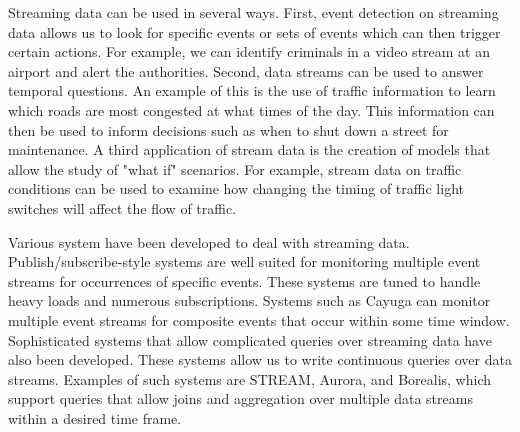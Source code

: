 \documentclass{article}
\begin{document}
Streaming data can be used in several ways.
First, event detection on streaming data allows us to look for specific events or sets of events which can then trigger certain actions. For example, we can identify criminals in a video stream at an airport and alert the authorities. Second, data streams can be used to answer temporal questions. An example of this is the use of traffic information to learn which roads are most congested at what times of the day. This information can then be used to inform decisions such as when to shut down a street for maintenance. 
A third application of stream data is the creation of models that allow the study of "what if" scenarios. For example, stream data on traffic conditions can be used to examine how changing the timing of traffic light switches will affect the flow of traffic. 

Various system have been developed to deal with streaming data. Publish/subscribe-style systems are well suited for monitoring multiple event streams for occurrences of specific events. These systems are tuned to handle heavy loads and numerous subscriptions. Systems such as Cayuga can monitor multiple event streams for composite events that occur within some time window. Sophisticated systems that allow complicated queries over streaming data have also been developed. These systems allow us to write continuous queries over data streams. Examples of such systems are STREAM, Aurora, and Borealis, which support queries that allow joins and aggregation over multiple data streams within a desired time frame. 
\end{document}
